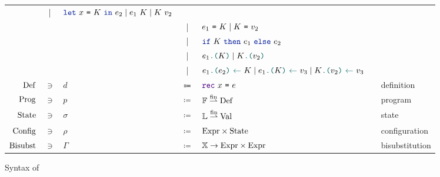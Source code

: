 \begin{figure}[tp]
\begin{tabular}{rclclcl}
            & | &
            $\lambdLet{x}{K}{e_2} \mid \lambdCall{e_1}{K} \mid \lambdCall{K}{v_2}$
        \\
            &&
            & | &
            $e_1\ \texttt{=}\ K \mid K\ \texttt{=}\ v_2$
        \\
            &&
            & | &
            $\lambdIf{K}{e_1}{e_2}$
        \\
            &&
            & | &
            $\lambdLoad{e_1}{K} \mid \lambdLoad{K}{v_2}$
        \\
            &&
            & | &
            $\lambdStore{e_1}{e_2}{K} \mid \lambdStore{e_1}{K}{v_3} \mid \lambdStore{K}{v_2}{v_3}$
        \\
            $\mathrm{Def}$
            & $\ni$ &
            $d$
            & $\Coloneqq$ &
            $\lambdDef{x}{e}$
            &&
            definition
        \\
            $\mathrm{Prog}$
            & $\ni$ &
            $p$
            & $\coloneqq$ &
            $\mathbb{F} \stackrel{\mathrm{fin}}{\rightharpoonup} \mathrm{Def}$
            &&
            program
        \\
            $\mathrm{State}$
            & $\ni$ &
            $\sigma$    
            & $\coloneqq$ &
            $\mathbb{L} \stackrel{\mathrm{fin}}{\rightharpoonup} \mathrm{Val}$
            &&
            state
        \\
            $\mathrm{Config}$
            & $\ni$ &
            $\rho$
            & $\coloneqq$ &
            $\mathrm{Expr} \times \mathrm{State}$
            &&
            configuration
        \\
            $\mathrm{Bisubst}$
            & $\ni$ &
            $\Gamma$
            & $\coloneqq$ &
            $\mathbb{X} \rightarrow \mathrm{Expr} \times \mathrm{Expr}$
            &&
            bisubstitution
    \end{tabular}
    \caption{Syntax of \LambdaLang}
    \label{fig:syntax}
\end{figure}